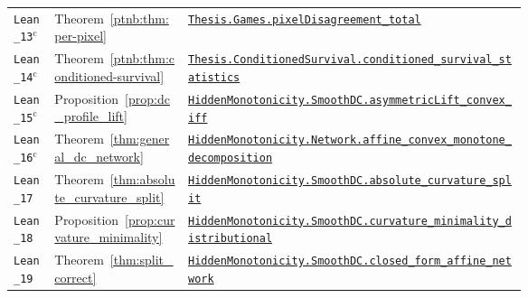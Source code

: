 {\begin{longtable}{@{}l l >{\raggedright\arraybackslash}p{0.66\linewidth}@{}}
\texttt{Lean\_13}$^{\mathrm c}$ & Theorem~\ref{ptnb:thm:per-pixel} & \href{https://github.com/JayPiZimmermann/A-Structural-Approach-to-Explainable-Deep-Learning/blob/b1c18a7ed02eadd720b0b693794ba7e7dd2628f6/formalization/Thesis/Games.lean\#L279}{\texttt{Thesis.\allowbreak Games.\allowbreak pixelDisagreement\_total}} \\
\texttt{Lean\_14}$^{\mathrm c}$ & Theorem~\ref{ptnb:thm:conditioned-survival} & \href{https://github.com/JayPiZimmermann/A-Structural-Approach-to-Explainable-Deep-Learning/blob/b1c18a7ed02eadd720b0b693794ba7e7dd2628f6/formalization/Thesis/ConditionedTrajectory.lean\#L204}{\texttt{Thesis.\allowbreak ConditionedSurvival.\allowbreak conditioned\_survival\_statistics}} \\
\texttt{Lean\_15}$^{\mathrm c}$ & Proposition~\ref{prop:dc_profile_lift} & \href{https://github.com/JayPiZimmermann/A-Structural-Approach-to-Explainable-Deep-Learning/blob/b1c18a7ed02eadd720b0b693794ba7e7dd2628f6/formalization/HiddenMonotonicity/MonotoneDCLift.lean\#L32}{\texttt{HiddenMonotonicity.\allowbreak SmoothDC.\allowbreak asymmetricLift\_convex\_iff}} \\
\texttt{Lean\_16}$^{\mathrm c}$ & Theorem~\ref{thm:general_dc_network} & \href{https://github.com/JayPiZimmermann/A-Structural-Approach-to-Explainable-Deep-Learning/blob/b1c18a7ed02eadd720b0b693794ba7e7dd2628f6/formalization/HiddenMonotonicity/ConvexMonotoneReadout.lean\#L114}{\texttt{HiddenMonotonicity.\allowbreak Network.\allowbreak affine\_convex\_monotone\_decomposition}} \\
\texttt{Lean\_17} & Theorem~\ref{thm:absolute_curvature_split} & \href{https://github.com/JayPiZimmermann/A-Structural-Approach-to-Explainable-Deep-Learning/blob/b1c18a7ed02eadd720b0b693794ba7e7dd2628f6/formalization/HiddenMonotonicity/CurvatureMonotoneDCLift.lean\#L395}{\texttt{HiddenMonotonicity.\allowbreak SmoothDC.\allowbreak absolute\_curvature\_split}} \\
\texttt{Lean\_18} & Proposition~\ref{prop:curvature_minimality} & \href{https://github.com/JayPiZimmermann/A-Structural-Approach-to-Explainable-Deep-Learning/blob/b1c18a7ed02eadd720b0b693794ba7e7dd2628f6/formalization/HiddenMonotonicity/DistributionalRegularity.lean\#L245}{\texttt{HiddenMonotonicity.\allowbreak SmoothDC.\allowbreak curvature\_minimality\_distributional}} \\
\texttt{Lean\_19} & Theorem~\ref{thm:split_correct} & \href{https://github.com/JayPiZimmermann/A-Structural-Approach-to-Explainable-Deep-Learning/blob/b1c18a7ed02eadd720b0b693794ba7e7dd2628f6/formalization/HiddenMonotonicity/ClosedFormMonotoneDC.lean\#L82}{\texttt{HiddenMonotonicity.\allowbreak SmoothDC.\allowbreak closed\_form\_affine\_network}} \\

\end{longtable}}
